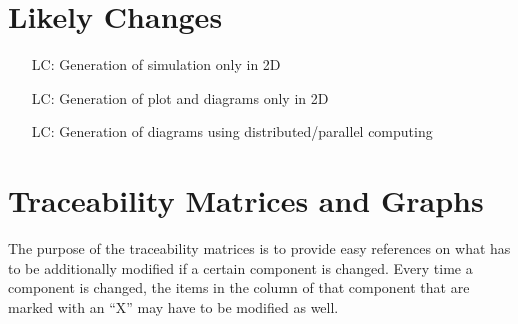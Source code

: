 \documentclass[12pt]{article}
\newcounter{lcnum} %
\begin{document}

\section{Likely Changes}    

\noindent \begin{itemize}

\item[LC\refstepcounter{lcnum}\thelcnum \label{only2dsim}:] Generation of 
simulation only in 2D
\item[LC\refstepcounter{lcnum}\thelcnum \label{only2dplot}:] Generation of 
plot and diagrams only in 2D
\item[LC\refstepcounter{lcnum}\thelcnum \label{maybe-mpi}:] Generation of 
diagrams using distributed/parallel computing

\end{itemize}

\section{Traceability Matrices and Graphs}

The purpose of the traceability matrices is to provide easy references on what
has to be additionally modified if a certain component is changed. Every time a
component is changed, the items in the column of that component that are marked
with an ``X'' may have to be modified as well. 

\end{document}
